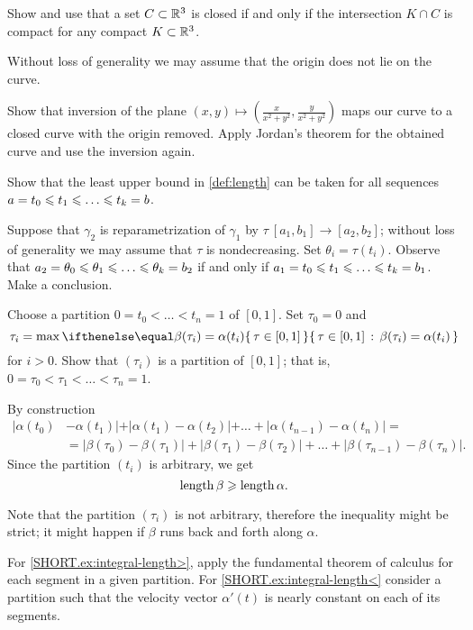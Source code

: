 Show and use that a set $C\subset \mathbb{R}^3$ is closed if and only if the intersection $K\cap C$ is compact for any compact $K\subset \mathbb{R}^3$.

Without loss of generality we may assume that the origin does not lie on the curve.

Show that inversion of the plane $(x,y)\mapsto (\tfrac{x}{x^2+y^2},\tfrac{y}{x^2+y^2})$ maps our curve to a closed curve with the origin removed.
Apply Jordan's theorem for the obtained curve and use the inversion again.

\setcounter{eqtn}{0}

Show that the least upper bound in \ref{def:length} can be taken for all sequences
$a=t_0\le t_1\le\z\dots\le t_k=b$.

Suppose that $\gamma_2$ is reparametrization of $\gamma_1$ by $\tau\:[a_1,b_1]\to [a_2,b_2]$;
without loss of generality we may assume that $\tau$ is nondecreasing.
Set $\theta_i=\tau(t_i)$.
Observe that $a_2=\theta_0\le\theta_1\le \z\dots\le\theta_k=b_2$ if and only if 
$a_1=t_0\le t_1\le\z\dots\le t_k=b_1$.
Make a conclusion.

Choose a partition $0=t_0<\dots <t_n=1$ of $[0,1]$.
Set $\tau_0=0$ and 
\[\tau_i=\max\set{\tau \in[0,1]}{\beta(\tau_i)=\alpha(t_i)}\]
for $i>0$.
Show that $(\tau_i)$ is a partition of $[0,1]$;
that is, $0=\tau_0<\tau_1<\dots<\tau_n=1$.

By construction 
\begin{align*}
|\alpha(t_0)&-\alpha(t_1)|+|\alpha(t_1)-\alpha(t_2)|+\dots+|\alpha(t_{n-1})-\alpha(t_n)|=
\\
&=
|\beta(\tau_0)-\beta(\tau_1)|+|\beta(\tau_1)-\beta(\tau_2)|+\dots+|\beta(\tau_{n-1})-\beta(\tau_n)|.
\end{align*}
Since the partition $(t_i)$ is arbitrary, we get 
\[\mathop{\rm length}\nolimits \beta\geqslant \mathop{\rm length}\nolimits \alpha.\]

Note that the partition $(\tau_i)$ is not arbitrary, therefore the inequality might be strict; it might happen if $\beta$ runs back and forth along $\alpha$.




For \ref{SHORT.ex:integral-length>}, apply the fundamental theorem of calculus for each segment in a given partition.
For \ref{SHORT.ex:integral-length<} consider a partition such that the velocity vector $\alpha'(t)$ is nearly constant on each of its segments.

